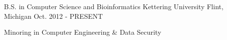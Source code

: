 

\begin{cventries}



  \cventry
    {B.S. in Computer Science and Bioinformatics} %
    {Kettering University} %
    {Flint, Michigan} %
    {Oct. 2012 - PRESENT} %
    {
      \begin{cvitems} %
        \item {Minoring in Computer Engineering \& Data Security}
      \end{cvitems}
    }

\end{cventries}

